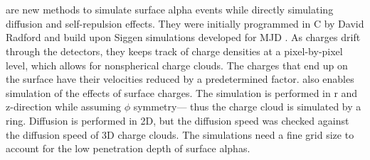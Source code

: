 





\section{{\tdsim}}

{\tdsim} are new methods to simulate surface alpha events while directly simulating diffusion and self-repulsion effects. They were initially programmed in C by David Radford and build upon Siggen simulations developed for MJD \cite{siggen_paper}. As charges drift through the detectors, they keeps track of charge densities at a pixel-by-pixel level, which allows for nonspherical charge clouds. The charges that end up on the surface have their velocities reduced by a predetermined factor. {\tdsim} also enables simulation of the effects of surface charges. The simulation is performed in r and z-direction while assuming $\phi$ symmetry— thus the charge cloud is simulated by a ring. Diffusion is performed in 2D, but the diffusion speed was checked against the diffusion speed of 3D charge clouds. The simulations need a fine grid size to account for the low penetration depth of surface alphas. 

